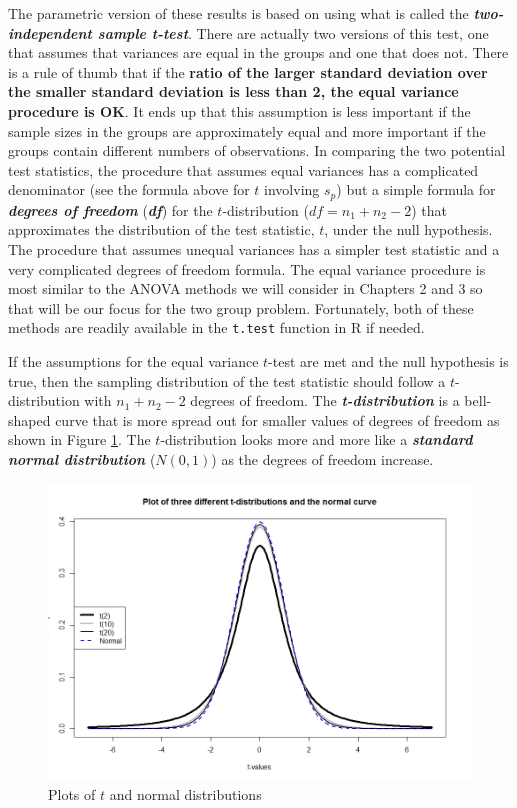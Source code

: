 \documentclass[]{book}
\theoremstyle{definition}
\theoremstyle{definition}
\theoremstyle{remark}
\begin{document}
The parametric version of these results is based on using what is called
the \textbf{\emph{two-independent sample t-test}}. There are actually
two versions of this test, one that assumes that variances are equal in
the groups and one that does not. There is a rule of thumb that if the
\textbf{ratio of the larger standard deviation over the smaller standard
deviation is less than 2, the equal variance procedure is OK}. It ends
up that this assumption is less important if the sample sizes in the
groups are approximately equal and more important if the groups contain
different numbers of observations. In comparing the two potential test
statistics, the procedure that assumes equal variances has a complicated
denominator (see the formula above for \(t\) involving \(s_p\)) but a
simple formula for \textbf{\emph{degrees of freedom}}
(\textbf{\emph{df}}) for the \(t\)-distribution (\(df=n_1+n_2-2\)) that
approximates the distribution of the test statistic, \(t\), under the
null hypothesis. The procedure that assumes unequal variances has a
simpler test statistic and a very complicated degrees of freedom
formula. The equal variance procedure is most similar to the ANOVA
methods we will consider in Chapters 2 and 3 so that will be our focus
for the two group problem. Fortunately, both of these methods are
readily available in the \texttt{t.test} function in R if needed.

If the assumptions for the equal variance \(t\)-test are met and the
null hypothesis is true, then the sampling distribution of the test
statistic should follow a \(t\)-distribution with \(n_1+n_2-2\) degrees
of freedom. The \textbf{\emph{t-distribution}} is a bell-shaped curve
that is more spread out for smaller values of degrees of freedom as
shown in Figure \ref{fig:Figure2-13}. The \(t\)-distribution looks more
and more like a \textbf{\emph{standard normal distribution}}
(\(N(0,1)\)) as the degrees of freedom increase.



\begin{figure}
\centering
\includegraphics{chapter1_files/image045small.png}
\caption{\label{fig:Figure2-13}Plots of \(t\) and normal distributions}
\end{figure}
\end{document}

